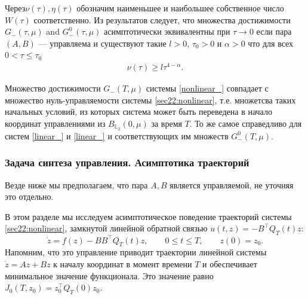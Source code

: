\documentclass[../main.tex]{subfiles}
\begin{document}
Через$\nu(\tau), \eta(\tau)$ обозначим наименьшее и наибольшее собственное число $W(\tau)$ соответственно. Из результатов  \cite{Polyak2001,GusOsSteklov,Osipov,GusevMotor} следует, что множества достижимости  
$G_{-}(\tau,\mu)$ and $G_{-}^0(\tau,\mu)$ асимптотически эквивалентны при $\tau \to 0$ если пара  $(A,B)$ --- управляема 
и существуют такие $ l > 0$, $\tau_0 > 0$ и $\alpha > 0$ что для всех $0 < \tau \leqslant \tau_0 $
		\begin{gather}\label{gramas}
			\nu(\tau)\geqslant l\tau^{4-\alpha}.
		\end{gather}

\begin{zam}
    Множество достижимости $G_{-}(T,\mu)$ системы \eqref{nonlinear_} совпадает с множество нуль-управляемости системы \eqref{sec22:nonlinear}, т.е. множетсва таких начальных условий, из которых система может быть переведена в начало координат управлениями из $B_{\mathbb{L}_2}(0,\mu) $ за время $T$. 
    То же самое справедливо для систем \eqref{linear_} и \eqref{linear_} и соответствующих им множеств $G_{-}^0(T,\mu)$.
\end{zam}

\subsubsection{Задача синтеза управления. Асимптотика траекторий}

Везде ниже мы предполагаем, что пара $A,B$ является управляемой, не уточняя это отдельно.

В этом разделе мы исследуем асимптотическое поведение траекторий системы \eqref{sec22:nonlinear}, замкнутой линейной обратной связью $ u(t,z) = -B^{\top} Q_T(t) z$:
\begin{equation}\label{nonlinear_closed}
	\dot{z} = f(z) - B B^{\top} Q_T(t) z, \qquad 0 \leqslant t \leqslant T, \qquad z(0) = z_0.
\end{equation}
Напомним, что это управление приводит траектории линейной системы $\dot{z} = A z + B z$ к началу координат в момент времени $T$ и обеспечивает минимальное значение функционала. 
Это значение равно $J_0(T,z_0) =z_0^{\top}Q_T(0)z_0$.
\end{document}
